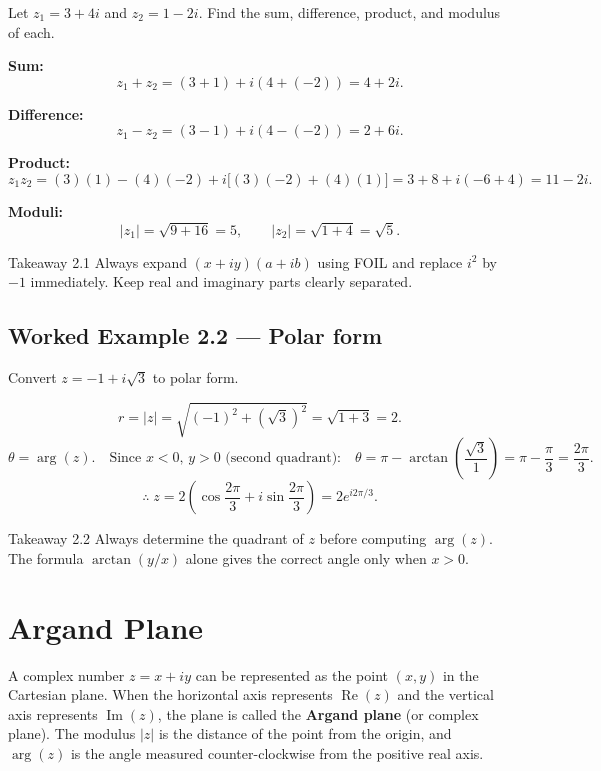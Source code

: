 \documentclass[12pt,a4paper]{article}
\begin{document}
Let \(z_1 = 3+4i\) and \(z_2 = 1-2i\).  Find the sum, difference, product,
and modulus of each.

\textbf{Sum:}
\[
  z_1 + z_2 = (3+1)+i(4+(-2)) = 4+2i.
\]

\textbf{Difference:}
\[
  z_1 - z_2 = (3-1)+i(4-(-2)) = 2+6i.
\]

\textbf{Product:}
\[
  z_1 z_2 = (3)(1)-(4)(-2) + i\bigl[(3)(-2)+(4)(1)\bigr]
           = 3+8 + i(-6+4) = 11-2i.
\]

\textbf{Moduli:}
\[
  |z_1| = \sqrt{9+16} = 5, \qquad |z_2| = \sqrt{1+4} = \sqrt{5}.
\]

\begin{learnbox}{Takeaway 2.1}
Always expand \((x+iy)(a+ib)\) using FOIL and replace \(i^2\) by \(-1\)
immediately.  Keep real and imaginary parts clearly separated.
\end{learnbox}

\subsection*{Worked Example 2.2 --- Polar form}

Convert \(z = -1 + i\sqrt{3}\) to polar form.

\[
  r = |z| = \sqrt{(-1)^2+(\sqrt{3})^2} = \sqrt{1+3} = 2.
\]
\[
  \theta = \arg(z).
  \quad \text{Since } x<0,\, y>0 \text{ (second quadrant):}
  \quad \theta = \pi - \arctan\!\left(\frac{\sqrt{3}}{1}\right)
               = \pi - \frac{\pi}{3} = \frac{2\pi}{3}.
\]
\[
  \therefore\; z = 2\!\left(\cos\frac{2\pi}{3} + i\sin\frac{2\pi}{3}\right)
               = 2e^{i2\pi/3}.
\]

\begin{learnbox}{Takeaway 2.2}
Always determine the quadrant of \(z\) before computing \(\arg(z)\).
The formula \(\arctan(y/x)\) alone gives the correct angle only when
\(x > 0\).
\end{learnbox}

\section{Argand Plane}

A complex number \(z = x+iy\) can be represented as the point
\((x,y)\) in the Cartesian plane.  When the horizontal axis represents
\(\operatorname{Re}(z)\) and the vertical axis represents
\(\operatorname{Im}(z)\), the plane is called the \textbf{Argand plane}
(or complex plane).  The modulus \(|z|\) is the distance of the point from
the origin, and \(\arg(z)\) is the angle measured counter-clockwise from the
positive real axis.
\end{document}
